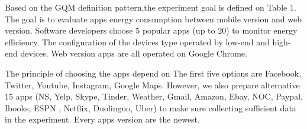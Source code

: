 




Based on the GQM definition pattern,the experiment goal is defined on Table 1. The goal is to evaluate apps energy consumption between mobile version and web version. Software developers choose 5 popular apps (up to 20) to monitor energy efficiency. The configuration of the devices type operated by low-end and high-end devices. Web version apps are all operated on Google Chrome.

The principle of choosing the apps depend on %
The first five options are Facebook,  Twitter, Youtube, Instagram, Google Maps. However, we also prepare alternative 15 apps (NS, Yelp, Skype, Tinder, Weather, Gmail, Amazon, Ebay, NOC, Paypal, Ibooks, ESPN , Netflix, Duolinguo, Uber) to make sure collecting sufficient data in the experiment. Every apps version are the newest.

